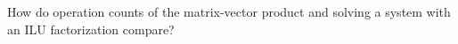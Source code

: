   How do operation counts of the matrix-vector product and solving a
  system with an \ac{ILU} factorization compare?
